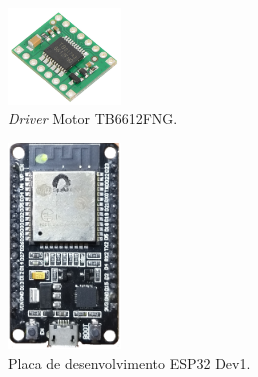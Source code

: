 \begin{figure}[H]
    \centering
    \includegraphics[width=3cm]{figuras/eletronica/driver.jpg}
    \caption{\textit{Driver} Motor TB6612FNG.}
    \label{fig:driver_motor}
\end{figure}

\begin{figure}[H]
    \centering
    \includegraphics[width=3cm]{figuras/eletronica/esp32_kit.png}
    \caption{Placa de desenvolvimento ESP32 Dev1.}
    \label{fig:esp32_kit}
\end{figure}